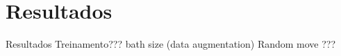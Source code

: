 \section{Resultados} %
\label{sec:resultados}
Resultados
Treinamento??? bath size
(data augmentation) Random move ???












